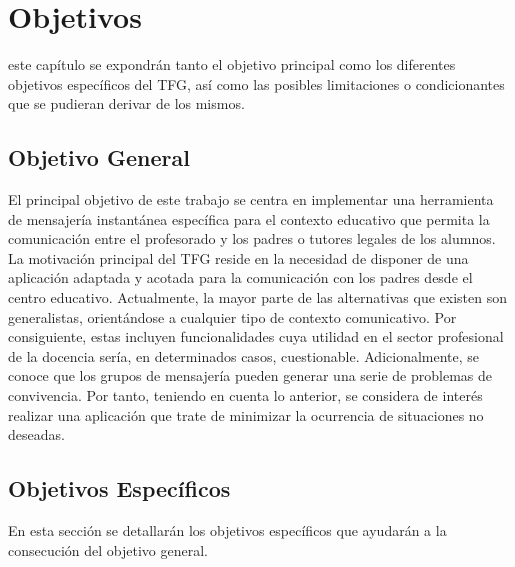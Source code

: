 \chapter{Objetivos}
\label{chap:objetivos}

\noindent

 este capítulo se expondrán tanto el objetivo principal como los diferentes objetivos específicos del \acs{TFG}, así como las posibles limitaciones o condicionantes que se pudieran derivar de los mismos.

\section{Objetivo General}
El principal objetivo de este trabajo se centra en implementar una herramienta de mensajería instantánea específica para el contexto educativo que permita la comunicación entre el profesorado y los padres o tutores legales de los alumnos. La motivación principal del \acs{TFG} reside en la necesidad de disponer de una aplicación adaptada y acotada para la comunicación con los padres desde el centro educativo. Actualmente, la mayor parte de las alternativas que existen son generalistas, orientándose a cualquier tipo de contexto comunicativo. Por consiguiente, estas incluyen funcionalidades cuya utilidad en el sector profesional de la docencia sería, en determinados casos, cuestionable. Adicionalmente, se conoce que los grupos de mensajería pueden generar una serie de problemas de convivencia. Por tanto, teniendo en cuenta lo anterior, se considera de interés realizar una aplicación que trate de minimizar la ocurrencia de situaciones no deseadas.

\section{Objetivos Específicos}
En esta sección se detallarán los objetivos específicos que ayudarán a la consecución del objetivo general.

\clearpage

